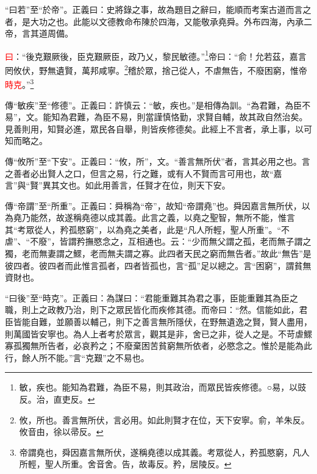 {\noindent\shu{}\fzkt “曰若”至“於帝”。正義曰：史將錄之事，故為題目之辭曰，能順而考案古道而言之者，是大功之也。此能以文德教命布陳於四海，又能敬承堯舜。外布四海，內承二帝，言其道周備。 \par}

\textcolor{red}{曰}：“後克艱厥後，臣克艱厥臣，政乃乂，黎民敏德。”\footnote{敏，疾也。能知為君難，為臣不易，則其政治，而眾民皆疾修德。○易，以豉反。治，直吏反。}帝曰：“俞！允若茲，嘉言罔攸伏，野無遺賢，萬邦咸寧。\footnote{攸，所也。善言無所伏，言必用。如此則賢才在位，天下安寧。俞，羊朱反。攸音由，徐以帚反。}稽於眾，捨己從人，不虐無告，不廢困窮，惟帝\textcolor{red}{時克}。”\footnote{帝謂堯也，舜因嘉言無所伏，遂稱堯德以成其義。考眾從人，矜孤愍窮，凡人所輕，聖人所重。舍音舍。告，故毒反。矜，居陵反。}

{\noindent\zhuan{}\fzbyks 傳“敏疾”至“修德”。正義曰：許慎云：“敏，疾也。”是相傳為訓。“為君難，為臣不易”，文。能知為君難，為臣不易，則當謹慎恪勤，求賢自輔，故其政自然治矣。見善則用，知賢必進，眾民各自舉，則皆疾修德矣。此經上不言者，承上事，以可知而略之。 \par}

{\noindent\zhuan{}\fzbyks 傳“攸所”至“下安”。正義曰：“攸，所”，文。“善言無所伏”者，言其必用之也。言之善者必出賢人之口，但言之易，行之難，或有人不賢而言可用也，故“嘉言”與“賢”異其文也。如此用善言，任賢才在位，則天下安。 \par}

{\noindent\zhuan{}\fzbyks 傳“帝謂”至“所重”。正義曰：舜稱為“帝”，故知“帝謂堯”也。舜因嘉言無所伏，以為堯乃能然，故遂稱堯德以成其義。此言之義，以堯之聖智，無所不能，惟言其“考眾從人，矜孤愍窮”，以為堯之美者，此是“凡人所輕，聖人所重”。“不虐”、“不廢”，皆謂矜撫愍念之，互相通也。云：“少而無父謂之孤，老而無子謂之獨，老而無妻謂之鰥，老而無夫謂之寡。此四者天民之窮而無告者。”故此“無告”是彼四者。彼四者而此惟言孤者，四者皆孤也，言“孤”足以總之。言“困窮”，謂貧無資財也。 \par}

{\noindent\shu{}\fzkt “曰後”至“時克”。正義曰：為謀曰：“君能重難其為君之事，臣能重難其為臣之職，則上之政教乃治，則下之眾民皆化而疾修其德。而帝曰：“然。信能如此，君臣皆能自難，並願善以輔己，則下之善言無所隱伏，在野無遺逸之賢，賢人盡用，則萬國皆安寧也。為人上者考於眾言，觀其是非，舍已之非，從人之是。不苛虐鰥寡孤獨無所告者，必哀矜之；不廢棄困苦貧窮無所依者，必愍念之。惟於是能為此行，餘人所不能。”言“克艱”之不易也。 \par}


